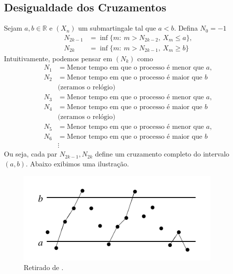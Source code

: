 \documentclass[12pt,a4paper,oneside]{book}
\theoremstyle{definition}
\theoremstyle{remark}
\numberwithin{equation}{section}
\newcommand{\R}{\mathbb{R}}
\begin{document}
\subsection{Desigualdade dos Cruzamentos}



Sejam $a,b\in \R$ e  $(X_n)$ um submartingale tal que $a<b$. Defina $N_0=-1$
\begin{align*}
N_{2k-1} & = \inf\{m:\ m>N_{2k-2},\ X_m\leq a\},\\
N_{2k} & = \inf\{m:\ m>N_{2k-1},\ X_m\geq b\}
\end{align*}
Intuitivamente, podemos pensar em $(N_k)$ como
\begin{align*}
N_1 &= \textrm{Menor tempo em que o processo é menor que }a,\\
N_2 &= \textrm{Menor tempo em que o processo é maior que }b\\
& \textrm{(zeramos o relógio)}\\
N_3 &= \textrm{Menor tempo em que o processo é menor que }a,\\
N_4 &= \textrm{Menor tempo em que o processo é maior que }b\\
& \textrm{(zeramos o relógio)}\\
N_5 &= \textrm{Menor tempo em que o processo é menor que }a,\\
N_6 &= \textrm{Menor tempo em que o processo é maior que }b\\
&\vdots
\end{align*}
Ou seja, cada par $N_{2k-1}, N_{2k}$ define um cruzamento completo do intervalo $(a,b)$.
Abaixo exibimos uma ilustração.


\begin{figure}[h]
\centering %
\includegraphics[width=10cm]{upcrossing} %
\caption{Retirado de \cite{durrett}. }
\end{figure}
 
\end{document}
